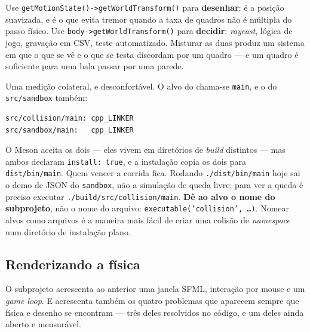 \begin{regra}
Use \texttt{getMotionState()->getWorldTransform()} para \textbf{desenhar}: é a
posição suavizada, e é o que evita tremor quando a taxa de quadros não é
múltipla do passo físico. Use
\texttt{body->getWorldTransform()} para \textbf{decidir}: \emph{raycast},
lógica de jogo, gravação em CSV, teste automatizado. Misturar as duas produz um
sistema em que o que se vê e o que se testa discordam por um quadro --- e um
quadro é suficiente para uma bala passar por uma parede.
\end{regra}

\begin{armadilha}
Uma medição colateral, e desconfortável. O alvo do  chama-se
\texttt{main}, e o do \texttt{src/sandbox} também:

\begin{lstlisting}[style=bt, language=bash,
    caption={\texttt{ninja -C build -t targets all | grep main}}]
src/collision/main: cpp_LINKER
src/sandbox/main:   cpp_LINKER
\end{lstlisting}

O Meson aceita os dois --- eles vivem em diretórios de \emph{build} distintos ---
mas ambos declaram \texttt{install: true}, e a instalação copia os dois para
\texttt{dist/bin/main}. Quem vencer a corrida fica. Rodando
\texttt{./dist/bin/main} hoje sai o demo de JSON do \texttt{sandbox}, não a
simulação de queda livre; para ver a queda é preciso executar
\texttt{./build/src/collision/main}. \textbf{Dê ao alvo o nome do subprojeto}, não
o nome do arquivo: \texttt{executable('collision', \ldots)}. Nomear alvos como
arquivos é a maneira mais fácil de criar uma colisão de \emph{namespace} num
diretório de instalação plano.
\end{armadilha}

\subsection{Renderizando a física}
\label{sec:sfml-bullet}

O subprojeto  acrescenta ao anterior uma janela SFML,
interação por mouse e um \emph{game loop}. E acrescenta também os quatro
problemas que aparecem sempre que física e desenho se encontram --- três deles
resolvidos no código, e um deles ainda aberto e mensurável.

